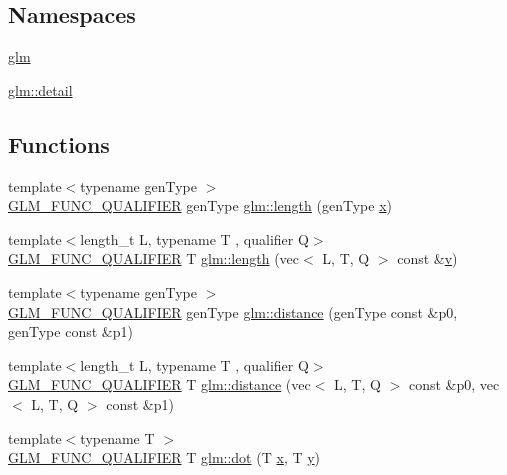 \subsection*{Namespaces}
\begin{DoxyCompactItemize}
\item 
 \hyperlink{namespaceglm}{glm}
\item 
 \hyperlink{namespaceglm_1_1detail}{glm\+::detail}
\end{DoxyCompactItemize}
\subsection*{Functions}
\begin{DoxyCompactItemize}
\item 
{\footnotesize template$<$typename gen\+Type $>$ }\\\hyperlink{setup_8hpp_a33fdea6f91c5f834105f7415e2a64407}{G\+L\+M\+\_\+\+F\+U\+N\+C\+\_\+\+Q\+U\+A\+L\+I\+F\+I\+ER} gen\+Type \hyperlink{namespaceglm_abcd8538aa95a8963803ec42c2fd654cd}{glm\+::length} (gen\+Type \hyperlink{_s_d_l__opengl_8h_ad0e63d0edcdbd3d79554076bf309fd47}{x})
\item 
{\footnotesize template$<$length\+\_\+t L, typename T , qualifier Q$>$ }\\\hyperlink{setup_8hpp_a33fdea6f91c5f834105f7415e2a64407}{G\+L\+M\+\_\+\+F\+U\+N\+C\+\_\+\+Q\+U\+A\+L\+I\+F\+I\+ER} T \hyperlink{group__core__func__geometric_ga0cdabbb000834d994a1d6dc56f8f5263}{glm\+::length} (vec$<$ L, T, Q $>$ const \&\hyperlink{_s_d_l__opengl_8h_a10a82eabcb59d2fcd74acee063775f90}{v})
\item 
{\footnotesize template$<$typename gen\+Type $>$ }\\\hyperlink{setup_8hpp_a33fdea6f91c5f834105f7415e2a64407}{G\+L\+M\+\_\+\+F\+U\+N\+C\+\_\+\+Q\+U\+A\+L\+I\+F\+I\+ER} gen\+Type \hyperlink{namespaceglm_aa7275be4cec4bfcf1c4a7add8f3ee7f4}{glm\+::distance} (gen\+Type const \&p0, gen\+Type const \&p1)
\item 
{\footnotesize template$<$length\+\_\+t L, typename T , qualifier Q$>$ }\\\hyperlink{setup_8hpp_a33fdea6f91c5f834105f7415e2a64407}{G\+L\+M\+\_\+\+F\+U\+N\+C\+\_\+\+Q\+U\+A\+L\+I\+F\+I\+ER} T \hyperlink{group__core__func__geometric_gaa68de6c53e20dfb2dac2d20197562e3f}{glm\+::distance} (vec$<$ L, T, Q $>$ const \&p0, vec$<$ L, T, Q $>$ const \&p1)
\item 
{\footnotesize template$<$typename T $>$ }\\\hyperlink{setup_8hpp_a33fdea6f91c5f834105f7415e2a64407}{G\+L\+M\+\_\+\+F\+U\+N\+C\+\_\+\+Q\+U\+A\+L\+I\+F\+I\+ER} T \hyperlink{namespaceglm_a40370edb74dec9048258c063b9c091c9}{glm\+::dot} (T \hyperlink{_s_d_l__opengl_8h_ad0e63d0edcdbd3d79554076bf309fd47}{x}, T \hyperlink{_s_d_l__opengl_8h_a1675d9d7bb68e1657ff028643b4037e3}{y})

\end{DoxyCompactItemize}
